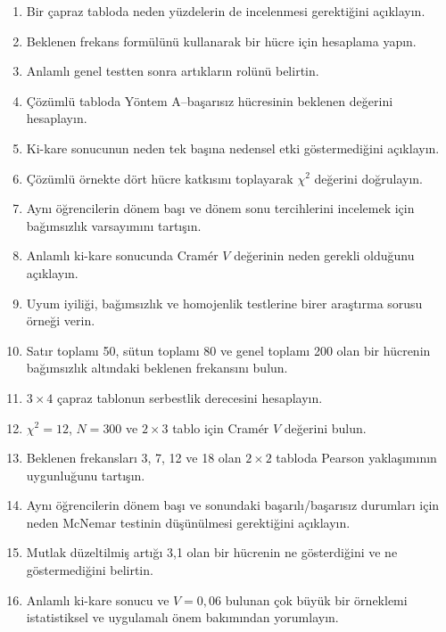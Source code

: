\begin{enumerate}
  \item Bir çapraz tabloda neden yüzdelerin de incelenmesi gerektiğini açıklayın.
  \item Beklenen frekans formülünü kullanarak bir hücre için hesaplama yapın.
  \item Anlamlı genel testten sonra artıkların rolünü belirtin.
  \item Çözümlü tabloda Yöntem A--başarısız hücresinin beklenen değerini hesaplayın.
  \item Ki-kare sonucunun neden tek başına nedensel etki göstermediğini açıklayın.
  \item Çözümlü örnekte dört hücre katkısını toplayarak $\chi^2$ değerini doğrulayın.
  \item Aynı öğrencilerin dönem başı ve dönem sonu tercihlerini incelemek için bağımsızlık varsayımını tartışın.
  \item Anlamlı ki-kare sonucunda Cramér $V$ değerinin neden gerekli olduğunu açıklayın.
  \item Uyum iyiliği, bağımsızlık ve homojenlik testlerine birer araştırma
  sorusu örneği verin.
  \item Satır toplamı 50, sütun toplamı 80 ve genel toplamı 200 olan bir
  hücrenin bağımsızlık altındaki beklenen frekansını bulun.
  \item $3\times4$ çapraz tablonun serbestlik derecesini hesaplayın.
  \item $\chi^2=12$, $N=300$ ve $2\times3$ tablo için Cramér $V$ değerini bulun.
  \item Beklenen frekansları 3, 7, 12 ve 18 olan $2\times2$ tabloda Pearson
  yaklaşımının uygunluğunu tartışın.
  \item Aynı öğrencilerin dönem başı ve sonundaki başarılı/başarısız
  durumları için neden McNemar testinin düşünülmesi gerektiğini açıklayın.
  \item Mutlak düzeltilmiş artığı 3,1 olan bir hücrenin ne gösterdiğini ve ne
  göstermediğini belirtin.
  \item Anlamlı ki-kare sonucu ve $V=0{,}06$ bulunan çok büyük bir örneklemi
  istatistiksel ve uygulamalı önem bakımından yorumlayın.
\end{enumerate}

